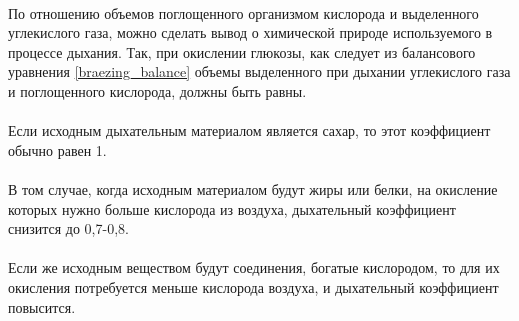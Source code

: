 \paragraph*{}По отношению объемов поглощенного организмом кислорода и выделенного углекислого газа, можно сделать вывод о химической природе используемого в процессе дыхания. Так, при окислении глюкозы, как следует из балансового уравнения \ref{braezing_balance} объемы выделенного при дыхании углекислого газа и поглощенного кислорода, должны быть равны. 


\paragraph*{}Если исходным дыхательным материалом является сахар, то этот коэффициент обычно равен 1.

\paragraph*{}В том случае, когда исходным материалом будут жиры или белки, на окисление которых нужно больше кислорода из воздуха, дыхательный коэффициент снизится до 0,7-0,8.


\paragraph*{}Если же исходным веществом будут соединения, богатые кислородом, то для их окисления потребуется меньше кислорода воздуха, и дыхательный коэффициент повысится.


